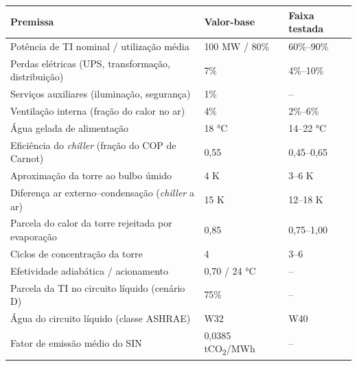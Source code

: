 \begin{tabular}{@{}p{8.2cm}ll@{}}
		\toprule
		\textbf{Premissa} & \textbf{Valor-base} & \textbf{Faixa testada} \\
		\midrule
		Potência de TI nominal / utilização média & 100 MW / 80\% & 60\%--90\% \\
		Perdas elétricas (UPS, transformação, distribuição) & 7\% & 4\%--10\% \\
		Serviços auxiliares (iluminação, segurança) & 1\% & -- \\
		Ventilação interna (fração do calor no ar) & 4\% & 2\%--6\% \\
		Água gelada de alimentação & 18 °C & 14--22 °C \\
		Eficiência do \textit{chiller} (fração do COP de Carnot) & 0,55 & 0,45--0,65 \\
		Aproximação da torre ao bulbo úmido & 4 K & 3--6 K \\
		Diferença ar externo--condensação (\textit{chiller} a ar) & 15 K & 12--18 K \\
		Parcela do calor da torre rejeitada por evaporação & 0,85 & 0,75--1,00 \\
		Ciclos de concentração da torre & 4 & 3--6 \\
		Efetividade adiabática / acionamento & 0,70 / 24 °C & -- \\
		Parcela da TI no circuito líquido (cenário D) & 75\% & -- \\
		Água do circuito líquido (classe ASHRAE) & W32 & W40 \\
		Fator de emissão médio do SIN & 0,0385 tCO\textsubscript{2}/MWh & -- \\
		\bottomrule
	\end{tabular}
